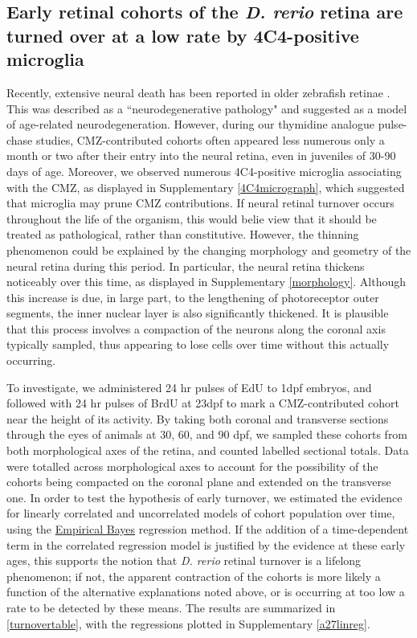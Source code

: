 \documentclass{ut-thesis}
\begin{document}
\begin{NoHyper}
\section{Early retinal cohorts of the \textit{D. rerio} retina are turned over at a low rate by 4C4-positive microglia}
\label{sec:neuralfate}
Recently, extensive neural death has been reported in older zebrafish retinae \cite{Vanhoucke2018}. This was described as a ``neurodegenerative pathology" and suggested as a model of age-related neurodegeneration. However, during our thymidine analogue pulse-chase studies, CMZ-contributed cohorts often appeared less numerous only a month or two after their entry into the neural retina, even in juveniles of 30-90 days of age. Moreover, we observed numerous 4C4-positive microglia associating with the CMZ, as displayed in Supplementary \autoref{4C4micrograph}, which suggested that microglia may prune CMZ contributions. If neural retinal turnover occurs throughout the life of the organism, this would belie view that it should be treated as pathological, rather than constitutive. However, the thinning phenomenon could be explained by the changing morphology and geometry of the neural retina during this period. In particular, the neural retina thickens noticeably over this time, as displayed in Supplementary \autoref{morphology}. Although this increase is due, in large part, to the lengthening of photoreceptor outer segments, the inner nuclear layer is also significantly thickened. It is plausible that this process involves a compaction of the neurons along the coronal axis typically sampled, thus appearing to lose cells over time without this actually occurring. 

To investigate, we administered 24 hr pulses of EdU to 1dpf embryos, and followed with 24 hr pulses of BrdU at 23dpf to mark a CMZ-contributed cohort near the height of its activity. By taking both coronal and transverse sections through the eyes of animals at 30, 60, and 90 dpf, we sampled these cohorts from both morphological axes of the retina, and counted labelled sectional totals. Data were totalled across morphological axes to account for the possibility of the cohorts being compacted on the coronal plane and extended on the transverse one. In order to test the hypothesis of early turnover, we estimated the evidence for linearly correlated and uncorrelated models of cohort population over time, using the \hyperref[ssec:EmpiricalBayes]{Empirical Bayes} regression method. If the addition of a time-dependent term in the correlated regression model is justified by the evidence at these early ages, this supports the notion that \textit{D. rerio} retinal turnover is a lifelong phenomenon; if not, the apparent contraction of the cohorts is more likely a function of the alternative explanations noted above, or is occurring at too low a rate to be detected by these means. The results are summarized in \autoref{turnovertable}, with the regressions plotted in Supplementary \autoref{a27linreg}.


\end{NoHyper}
\end{document}
